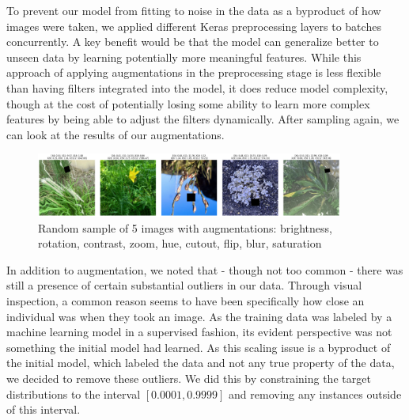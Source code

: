 \documentclass[12pt,a4paper,oneside]{article}
\begin{document}
To prevent our model from fitting to noise in the data as a byproduct of how images were taken, we applied different Keras preprocessing layers to batches concurrently. A key benefit would be that the model can generalize better to unseen data by learning potentially more meaningful features. While this approach of applying augmentations in the preprocessing stage is less flexible than having filters integrated into the model, it does reduce model complexity, though at the cost of potentially losing some ability to learn more complex features by being able to adjust the filters dynamically. After sampling again, we can look at the results of our augmentations. 

\begin{figure}[!h]
    \centering
    \includegraphics[width=0.9\textwidth]{assets/after_aug_img.png}
    \caption{Random sample of 5 images with augmentations: brightness, rotation, contrast, zoom, hue, cutout, flip, blur, saturation}
\end{figure}


\smallskip 
In addition to augmentation, we noted that - though not too common - there was still a presence of certain substantial outliers in our data. Through visual inspection, a common reason seems to have been specifically how close an individual was when they took an image. As the training data was labeled by a machine learning model in a supervised fashion, its evident perspective was not something the initial model had learned. As this scaling issue is a byproduct of the initial model, which labeled the data and not any true property of the data, we decided to remove these outliers. We did this by constraining the target distributions to the interval $[0.0001, 0.9999]$ and removing any instances outside of this interval.
\end{document}
